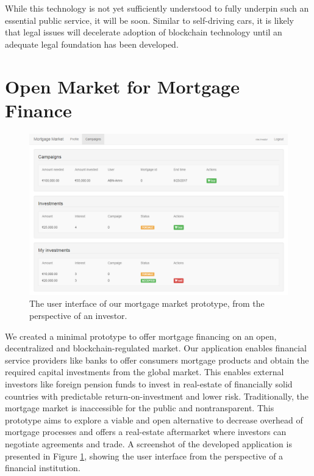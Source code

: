 \documentclass[USenglish]{article}
\begin{document}
While this technology is not yet sufficiently understood to fully underpin such an essential public service, it will be soon.
Similar to self-driving cars, it is likely that legal issues will decelerate adoption of blockchain technology until an adequate legal foundation has been developed.

\section{Open Market for Mortgage Finance}

\begin{figure}[t]
	\centering
	\includegraphics[width=1\columnwidth]{assets/mortgagemarket}
	\caption{The user interface of our mortgage market prototype, from the perspective of an investor.}
	\label{fig:mortgage_market_interface}
\end{figure}

We created a minimal prototype to offer mortgage financing on an open, decentralized and blockchain-regulated market.
Our application enables financial service providers like banks to offer consumers mortgage products and obtain the required capital investments from the global market.
This enables external investors like foreign pension funds to invest in real-estate of financially solid countries with predictable return-on-investment and lower risk.
Traditionally, the mortgage market is inaccessible for the public and nontransparent.
This prototype aims to explore a viable and open alternative to decrease overhead of mortgage processes and offers a real-estate aftermarket where investors can negotiate agreements and trade.
A screenshot of the developed application is presented in Figure \ref{fig:mortgage_market_interface}, showing the user interface from the perspective of a financial institution.
\end{document}
